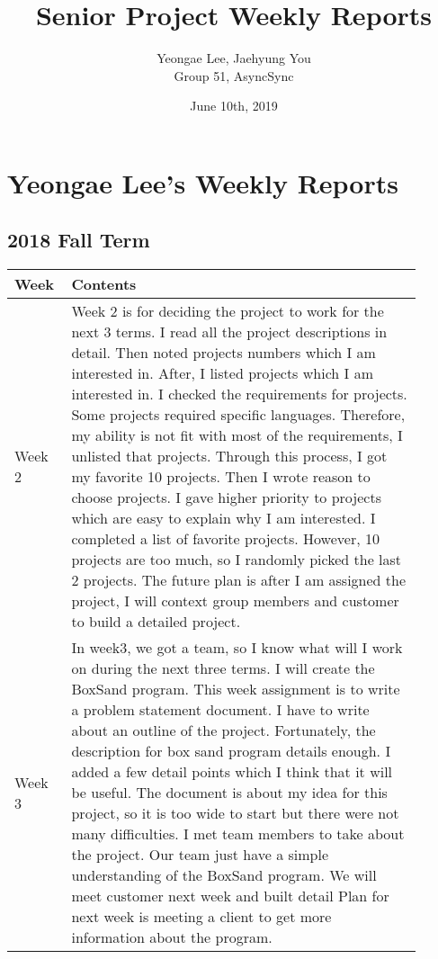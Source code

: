 \documentclass[10pt]{article}
\title{Senior Project Weekly Reports}
\author{Yeongae Lee, Jaehyung You \\ Group 51, AsyncSync}
\date{June 10th, 2019}
\begin{document}
\maketitle

\section{Yeongae Lee's Weekly Reports}
    \subsection{2018 Fall Term}
        \begin{center}
        \begin{tabular}{ | p{0.1\linewidth} | p{0.8\linewidth} | } \hline
            Week & Contents  \\ \hline  
            Week 2 & Week 2 is for deciding the project to work for the next 3 terms. I read all the project descriptions in detail. Then noted projects numbers which I am interested in. After, I listed projects which I am interested in. I checked the requirements for projects. Some projects required specific languages. Therefore, my ability is not fit with most of the requirements, I unlisted that projects. Through this process, I got my favorite 10 projects. Then I wrote reason to choose projects. I gave higher priority to projects which are easy to explain why I am interested. I completed a list of favorite projects. However, 10 projects are too much, so I randomly picked the last 2 projects. The future plan is after I am assigned the project, I will context group members and customer to build a detailed project.  \\ \hline
            Week 3 & In week3, we got a team, so I know what will I work on during the next three terms. I will create the BoxSand program. This week assignment is to write a problem statement document. I have to write about an outline of the project. Fortunately, the description for box sand program details enough. I added a few detail points which I think that it will be useful. The document is about my idea for this project, so it is too wide to start but there were not many difficulties. I met team members to take about the project. Our team just have a simple understanding of the BoxSand program. We will meet customer next week and built detail Plan for next week is meeting a client to get more information about the program.  \\ \hline

\end{tabular}
\end{center}
\end{document}
